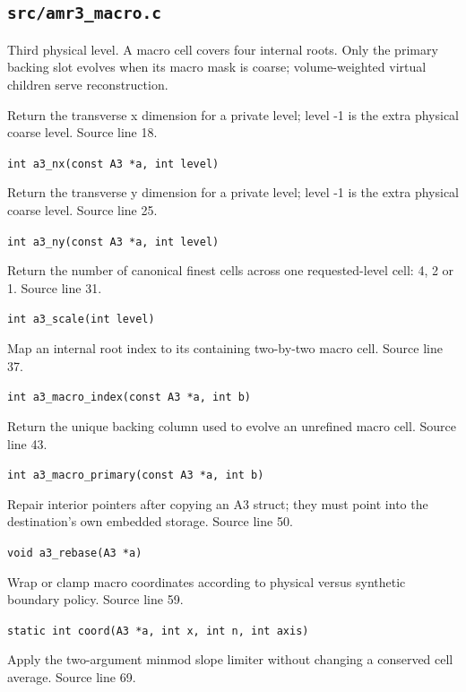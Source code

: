 \subsection{\texttt{src/amr3\_macro.c}}
Third physical level. A macro cell covers four internal roots. Only the primary backing slot evolves when its macro mask is coarse; volume-weighted virtual children serve reconstruction.
\begin{description}[style=nextline,leftmargin=0pt,labelindent=0pt,labelwidth=0pt,labelsep=0pt]
\item[\texttt{a3\_nx}] Return the transverse x dimension for a private level; level -1 is the extra physical coarse level. Source line 18.\par
{\small\nolinkurl{int a3_nx(const A3 *a, int level)}}
\item[\texttt{a3\_ny}] Return the transverse y dimension for a private level; level -1 is the extra physical coarse level. Source line 25.\par
{\small\nolinkurl{int a3_ny(const A3 *a, int level)}}
\item[\texttt{a3\_scale}] Return the number of canonical finest cells across one requested-level cell: 4, 2 or 1. Source line 31.\par
{\small\nolinkurl{int a3_scale(int level)}}
\item[\texttt{a3\_macro\_index}] Map an internal root index to its containing two-by-two macro cell. Source line 37.\par
{\small\nolinkurl{int a3_macro_index(const A3 *a, int b)}}
\item[\texttt{a3\_macro\_primary}] Return the unique backing column used to evolve an unrefined macro cell. Source line 43.\par
{\small\nolinkurl{int a3_macro_primary(const A3 *a, int b)}}
\item[\texttt{a3\_rebase}] Repair interior pointers after copying an A3 struct; they must point into the destination's own embedded storage. Source line 50.\par
{\small\nolinkurl{void a3_rebase(A3 *a)}}
\item[\texttt{coord}] Wrap or clamp macro coordinates according to physical versus synthetic boundary policy. Source line 59.\par
{\small\nolinkurl{static int coord(A3 *a, int x, int n, int axis)}}
\item[\texttt{mm}] Apply the two-argument minmod slope limiter without changing a conserved cell average. Source line 69.\par

\end{description}
